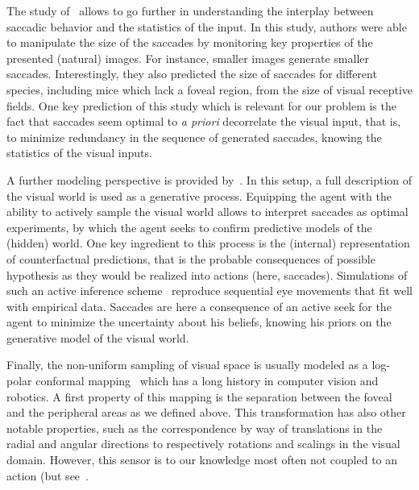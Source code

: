 The study of~\citep{Samonds18} allows to go further in understanding the interplay between saccadic behavior and the statistics of the input. In this study, authors were able to manipulate the size of the saccades by monitoring key properties of the presented (natural) images. For instance, smaller images generate smaller saccades. Interestingly, they also predicted the size of saccades for different species, including mice which lack a foveal region, from the size of visual receptive fields. One key prediction of this study which is relevant for our problem is the fact that saccades seem optimal to \emph{a priori} decorrelate the visual input, that is, to minimize redundancy in the sequence of generated saccades, knowing the statistics of the visual inputs.

A further modeling perspective is provided by~\citep{Friston12}. In this setup, a full description of the visual world is used as a generative process. %
Equipping the agent with the ability to actively sample the visual world %
allows to interpret saccades as optimal experiments, by which the agent seeks to confirm predictive models of the (hidden) world. One key ingredient to this process is the (internal) representation of counterfactual predictions, that is the probable consequences of possible hypothesis as they would be realized into actions (here, saccades).
Simulations of such an active inference scheme~\citep{Mirza18} 
reproduce sequential eye movements that fit well with empirical data. %
Saccades %
are here a consequence of an active seek for the agent to minimize the uncertainty about his beliefs, knowing his priors on the generative model of the visual world. %
\ICANN
\else

\fi
Finally, the non-uniform sampling of visual space is usually modeled as a log-polar conformal mapping~\citep{Traver10} which has a long history in computer vision and robotics. A first property of this mapping is the separation between the foveal and the peripheral areas as we defined above. This transformation has also other notable properties, such as the correspondence by way of translations in the radial and angular directions to respectively rotations and scalings in the visual domain. However, this sensor is to our knowledge most often not coupled to an action
\ICANN
\else
 (but see~\citep{ref_needed)}\fi. 

